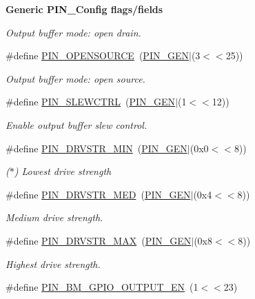 \begin{Indent}{\bf Generic P\+I\+N\+\_\+\+Config flags/fields}
\begin{DoxyCompactItemize}
\begin{DoxyCompactList}\small\item\em Output buffer mode\+: open drain. \end{DoxyCompactList}\item 
\#define \hyperlink{_p_i_n_8h_a649eb3b178440cda981471c27ff761e5}{P\+I\+N\+\_\+\+O\+P\+E\+N\+S\+O\+U\+R\+C\+E}~(\hyperlink{_p_i_n_8h_ae1f7e47a17caab9697e69e5b9aff270b}{P\+I\+N\+\_\+\+G\+E\+N}$\vert$(3$<$$<$25))
\begin{DoxyCompactList}\small\item\em Output buffer mode\+: open source. \end{DoxyCompactList}\item 
\#define \hyperlink{_p_i_n_8h_afb6df44a1496358f288b2e90dce81a13}{P\+I\+N\+\_\+\+S\+L\+E\+W\+C\+T\+R\+L}~(\hyperlink{_p_i_n_8h_ae1f7e47a17caab9697e69e5b9aff270b}{P\+I\+N\+\_\+\+G\+E\+N}$\vert$(1$<$$<$12))
\begin{DoxyCompactList}\small\item\em Enable output buffer slew control. \end{DoxyCompactList}\item 
\#define \hyperlink{_p_i_n_8h_a2a7469e68c23d12b137362dca78a7ae8}{P\+I\+N\+\_\+\+D\+R\+V\+S\+T\+R\+\_\+\+M\+I\+N}~(\hyperlink{_p_i_n_8h_ae1f7e47a17caab9697e69e5b9aff270b}{P\+I\+N\+\_\+\+G\+E\+N}$\vert$(0x0$<$$<$8))
\begin{DoxyCompactList}\small\item\em ($\ast$) Lowest drive strength \end{DoxyCompactList}\item 
\#define \hyperlink{_p_i_n_8h_aa0c4f9401637a2170b192d5c69faa33b}{P\+I\+N\+\_\+\+D\+R\+V\+S\+T\+R\+\_\+\+M\+E\+D}~(\hyperlink{_p_i_n_8h_ae1f7e47a17caab9697e69e5b9aff270b}{P\+I\+N\+\_\+\+G\+E\+N}$\vert$(0x4$<$$<$8))
\begin{DoxyCompactList}\small\item\em Medium drive strength. \end{DoxyCompactList}\item 
\#define \hyperlink{_p_i_n_8h_a218e028386e01367f6e86a2a69eb464a}{P\+I\+N\+\_\+\+D\+R\+V\+S\+T\+R\+\_\+\+M\+A\+X}~(\hyperlink{_p_i_n_8h_ae1f7e47a17caab9697e69e5b9aff270b}{P\+I\+N\+\_\+\+G\+E\+N}$\vert$(0x8$<$$<$8))
\begin{DoxyCompactList}\small\item\em Highest drive strength. \end{DoxyCompactList}\item 
\#define \hyperlink{_p_i_n_8h_a204ca90eb78a0715cca07c95d6b67e65}{P\+I\+N\+\_\+\+B\+M\+\_\+\+G\+P\+I\+O\+\_\+\+O\+U\+T\+P\+U\+T\+\_\+\+E\+N}~(1$<$$<$23)

\end{DoxyCompactItemize}
\end{Indent}

